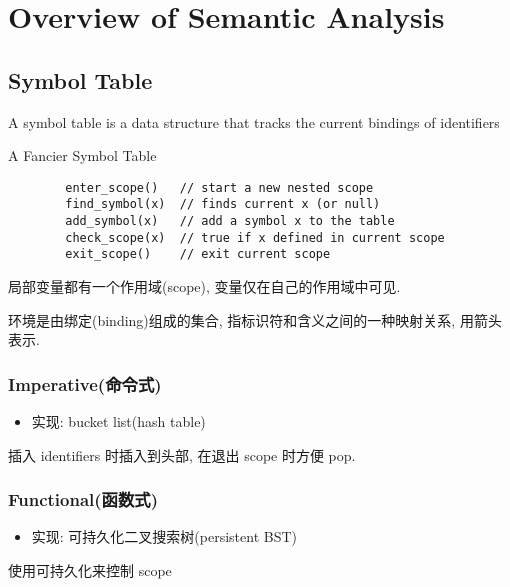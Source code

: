 \newpage
\section{Overview of Semantic Analysis}

\subsection{Symbol Table}
\begin{definition}
    A symbol table is a data structure that tracks the current bindings of identifiers
\end{definition}


\begin{code}
    \caption{A Fancier Symbol Table}
    \begin{verbatim}
        enter_scope()   // start a new nested scope
        find_symbol(x)  // finds current x (or null)
        add_symbol(x)   // add a symbol x to the table
        check_scope(x)  // true if x defined in current scope
        exit_scope()    // exit current scope
    \end{verbatim}
\end{code}

局部变量都有一个作用域(scope), 变量仅在自己的作用域中可见. 

环境是由绑定(binding)组成的集合, 指标识符和含义之间的一种映射关系, 用箭头表示.

\subsubsection{Imperative(命令式)}
\begin{itemize}
    \item 实现: bucket list(hash table)
\end{itemize}
插入 identifiers 时插入到头部, 在退出 scope 时方便 pop. 

\subsubsection{Functional(函数式)}
\begin{itemize}
    \item 实现: 可持久化二叉搜索树(persistent BST)
\end{itemize}
使用可持久化来控制 scope